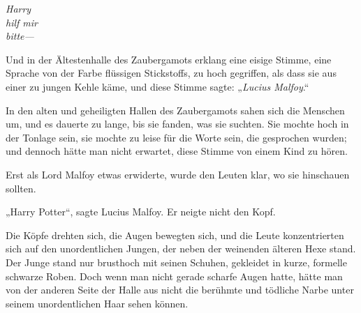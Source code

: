 

\emph{Harry\\
hilf mir\\
bitte—}

Und in der Ältestenhalle des Zaubergamots erklang eine eisige Stimme, eine Sprache von der Farbe flüssigen Stickstoffs, zu hoch gegriffen, als dass sie aus einer zu jungen Kehle käme, und diese Stimme sagte: „\emph{Lucius Malfoy}.“

\later

In den alten und geheiligten Hallen des Zaubergamots sahen sich die Menschen um, und es dauerte zu lange, bis sie fanden, was sie suchten. Sie mochte hoch in der Tonlage sein, sie mochte zu leise für die Worte sein, die gesprochen wurden; und dennoch hätte man nicht erwartet, diese Stimme von einem Kind zu hören.

Erst als Lord Malfoy etwas erwiderte, wurde den Leuten klar, wo sie hinschauen sollten.

„Harry Potter“, sagte Lucius Malfoy. Er neigte nicht den Kopf.

Die Köpfe drehten sich, die Augen bewegten sich, und die Leute konzentrierten sich auf den unordentlichen Jungen, der neben der weinenden älteren Hexe stand. Der Junge stand nur brusthoch mit seinen Schuhen, gekleidet in kurze, formelle schwarze Roben. Doch wenn man nicht gerade scharfe Augen hatte, hätte man von der anderen Seite der Halle aus nicht die berühmte und tödliche Narbe unter seinem unordentlichen Haar sehen können.

